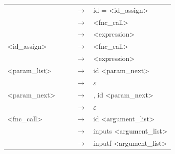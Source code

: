 \documentclass[a4paper, 11pt]{article}
\begin{document}
\begin{table}[!ht]
\begin{tabular}{lllll}
                                        &  &  & $\rightarrow$ & id = \textless{}id\_assign\textgreater{}                                                                                         \\
                                        &  &  & $\rightarrow$ & \textless{}fnc\_call\textgreater{}                                                                                               \\
                                        &  &  & $\rightarrow$ & \textless{}expression\textgreater{}                                                                                              \\
\textless{}id\_assign\textgreater{}     &  &  & $\rightarrow$ & \textless{}fnc\_call\textgreater{}                                                                                               \\
                                        &  &  & $\rightarrow$ & \textless{}expression\textgreater{}                                                                                              \\
\textless{}param\_list\textgreater{}    &  &  & $\rightarrow$ & id \textless{}param\_next\textgreater{}                                                                                          \\
                                        &  &  & $\rightarrow$ & $\varepsilon$                                                                                                                    \\
\textless{}param\_next\textgreater{}    &  &  & $\rightarrow$ & , id \textless{}param\_next\textgreater{}                                                                                        \\
                                        &  &  & $\rightarrow$ & $\varepsilon$                                                                                                                    \\
\textless{}fnc\_call\textgreater{}      &  &  & $\rightarrow$ & id \textless{}argument\_list\textgreater{}                                                                                       \\
                                        &  &  & $\rightarrow$ & inputs \textless{}argument\_list\textgreater{}                                                                                   \\
                                        &  &  & $\rightarrow$ & inputf \textless{}argument\_list\textgreater{}                                                                                   \\

\end{tabular}
\end{table}
\end{document}
